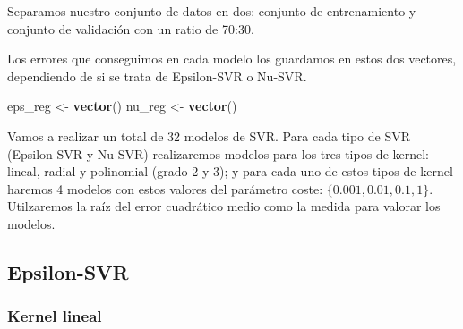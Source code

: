 \documentclass[
]{article}
\newenvironment{Shaded}{\begin{snugshade}}{\end{snugshade}}
\newcommand{\DataTypeTok}[1]{\textcolor[rgb]{0.13,0.29,0.53}{#1}}
\newcommand{\DecValTok}[1]{\textcolor[rgb]{0.00,0.00,0.81}{#1}}
\newcommand{\FloatTok}[1]{\textcolor[rgb]{0.00,0.00,0.81}{#1}}
\newcommand{\KeywordTok}[1]{\textcolor[rgb]{0.13,0.29,0.53}{\textbf{#1}}}
\newcommand{\NormalTok}[1]{#1}
\newcommand{\OperatorTok}[1]{\textcolor[rgb]{0.81,0.36,0.00}{\textbf{#1}}}
\newcommand{\OtherTok}[1]{\textcolor[rgb]{0.56,0.35,0.01}{#1}}
\newcommand{\StringTok}[1]{\textcolor[rgb]{0.31,0.60,0.02}{#1}}
\begin{document}
Separamos nuestro conjunto de datos en dos: conjunto de entrenamiento y
conjunto de validación con un ratio de 70:30.

\begin{Shaded}
\end{Shaded}

Los errores que conseguimos en cada modelo los guardamos en estos dos
vectores, dependiendo de si se trata de Epsilon-SVR o Nu-SVR.

\begin{Shaded}
\begin{Highlighting}[]
\NormalTok{eps_reg <-}\StringTok{ }\KeywordTok{vector}\NormalTok{()}
\NormalTok{nu_reg <-}\StringTok{ }\KeywordTok{vector}\NormalTok{()}
\end{Highlighting}
\end{Shaded}

Vamos a realizar un total de 32 modelos de SVR. Para cada tipo de SVR
(Epsilon-SVR y Nu-SVR) realizaremos modelos para los tres tipos de
kernel: lineal, radial y polinomial (grado 2 y 3); y para cada uno de
estos tipos de kernel haremos 4 modelos con estos valores del parámetro
coste: \(\{0.001,0.01,0.1,1\}\). Utilzaremos la raíz del error
cuadrático medio como la medida para valorar los modelos.

\hypertarget{epsilon-svr}{%
\subsection{Epsilon-SVR}\label{epsilon-svr}}

\hypertarget{kernel-lineal}{%
\subsubsection{Kernel lineal}\label{kernel-lineal}}
\end{document}

